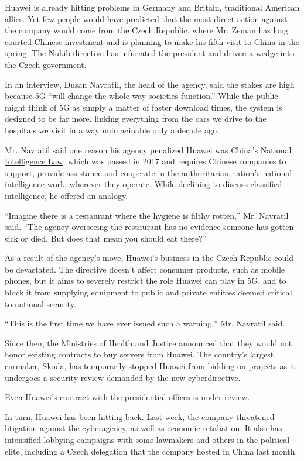 Huawei is already hitting problems in Germany and Britain, traditional
American allies. Yet few people would have predicted that the most
direct action against the company would come from the Czech Republic,
where Mr. Zeman has long courted Chinese investment and is planning to
make his fifth visit to China in the spring. The Nukib directive has
infuriated the president and driven a wedge into the Czech government.

In an interview, Dusan Navratil, the head of the agency, said the stakes
are high because 5G ``will change the whole way societies function.''
While the public might think of 5G as simply a matter of faster download
times, the system is designed to be far more, linking everything from
the cars we drive to the hospitals we visit in a way unimaginable only a
decade ago.

Mr. Navratil said one reason his agency penalized Huawei was China's
\href{https://www.nytimes.com/2017/05/31/business/china-cybersecurity-law.html}{National
Intelligence Law}, which was passed in 2017 and requires Chinese
companies to support, provide assistance and cooperate in the
authoritarian nation's national intelligence work, wherever they
operate. While declining to discuss classified intelligence, he offered
an analogy.

``Imagine there is a restaurant where the hygiene is filthy rotten,''
Mr. Navratil said. ``The agency overseeing the restaurant has no
evidence someone has gotten sick or died. But does that mean you should
eat there?''

As a result of the agency's move, Huawei's business in the Czech
Republic could be devastated. The directive doesn't affect consumer
products, such as mobile phones, but it aims to severely restrict the
role Huawei can play in 5G, and to block it from supplying equipment to
public and private entities deemed critical to national security.

``This is the first time we have ever issued such a warning,'' Mr.
Navratil said.

Since then, the Ministries of Health and Justice announced that they
would not honor existing contracts to buy servers from Huawei. The
country's largest carmaker, Skoda, has temporarily stopped Huawei from
bidding on projects as it undergoes a security review demanded by the
new cyberdirective.

Even Huawei's contract with the presidential offices is under review.

In turn, Huawei has been hitting back. Last week, the company threatened
litigation against the cyberagency, as well as economic retaliation. It
also has intensified lobbying campaigns with some lawmakers and others
in the political elite, including a Czech delegation that the company
hosted in China last month.

